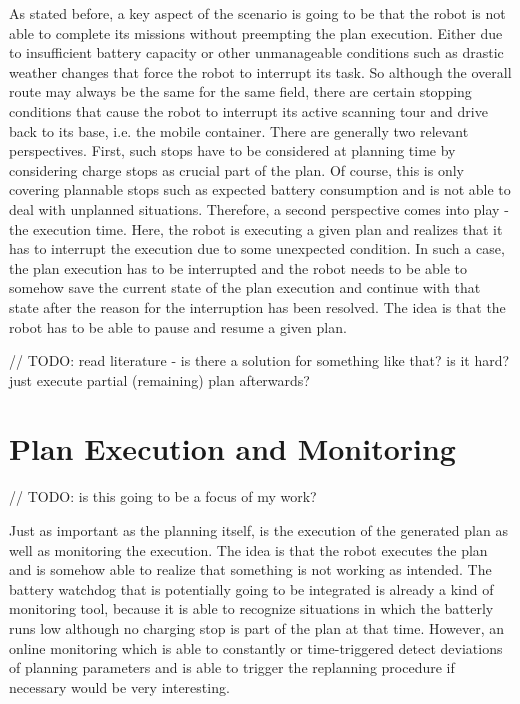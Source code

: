 \documentclass[german, master, expose, latin1]{base/thesis_KBS}
\begin{document}
As stated before, a key aspect of the scenario is going to be that the robot is not able to complete its missions without preempting the plan execution.
Either due to insufficient battery capacity or other unmanageable conditions such as drastic weather changes that force the robot to interrupt its task.
So although the overall route may always be the same for the same field, there are certain stopping conditions that cause the robot to interrupt its 
active scanning tour and drive back to its base, i.e. the mobile container.
There are generally two relevant perspectives. First, such stops have to be considered at planning time by considering charge stops as crucial part of the plan.
Of course, this is only covering plannable stops such as expected battery consumption and is not able to deal with unplanned situations.
Therefore, a second perspective comes into play - the execution time. Here, the robot is executing a given plan and realizes that it has to interrupt the execution
due to some unexpected condition. In such a case, the plan execution has to be interrupted and the robot needs to be able to somehow save the current state of the plan
execution and continue with that state after the reason for the interruption has been resolved.
The idea is that the robot has to be able to pause and resume a given plan.\newline

// TODO: read literature - is there a solution for something like that? is it hard? just execute partial (remaining) plan afterwards?

\section{Plan Execution and Monitoring}

// TODO: is this going to be a focus of my work?\newline

Just as important as the planning itself, is the execution of the generated plan as well as monitoring the execution.
The idea is that the robot executes the plan and is somehow able to realize that something is not working as intended. 
The battery watchdog that is potentially going to be integrated is already a kind of monitoring tool, because it is able to recognize situations 
in which the batterly runs low although no charging stop is part of the plan at that time. However, an online monitoring which is able to constantly or time-triggered 
detect deviations of planning parameters and is able to trigger the replanning procedure if necessary would be very interesting.\newline
\end{document}

